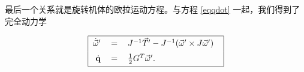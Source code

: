 最后一个关系就是旋转机体的欧拉运动方程。与方程 \eqref{eqqdot} 一起，我们得到了完全动力学

\begin{equation}
\begin{tabular}{|rcl|}
	\hline
	$\dot{\vec{\w}}'$ & $=$ & $J^{-1} \vec{T}' - J^{-1} (\vec{\w}' \c J \vec{\w}')   \phantom{\Big(}$ \\
	$\dot{\b{q}}$     & $=$ & $\frac{1}{2} G^T\vec{\w}'.   \phantom{\Big(}$ \\
	\hline
\end{tabular}
\label{rigid_euler_IN}
\end{equation}



%

%	
%		
%	
%	
%	
%	


%	

%

%

%
